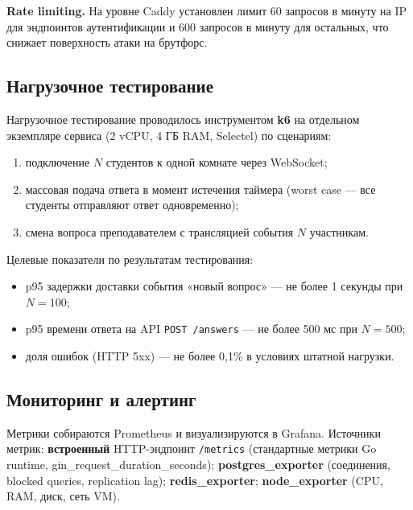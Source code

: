 \textbf{Rate limiting.} На уровне Caddy установлен лимит
60 запросов в минуту на IP для эндпоинтов аутентификации
и 600 запросов в минуту для остальных, что снижает поверхность
атаки на брутфорс.

\subsection{Нагрузочное тестирование}

Нагрузочное тестирование проводилось инструментом \textbf{k6}
на отдельном экземпляре сервиса (2 vCPU, 4 ГБ RAM, Selectel)
по сценариям:
\begin{enumerate}[label=\arabic*., noitemsep]
    \item подключение $N$ студентов к одной комнате
          через WebSocket;
    \item массовая подача ответа в момент истечения таймера
          (worst case --- все студенты отправляют ответ
          одновременно);
    \item смена вопроса преподавателем с трансляцией события
          $N$ участникам.
\end{enumerate}


Целевые показатели по результатам тестирования:
\begin{itemize}[noitemsep]
    \item p95 задержки доставки события «новый вопрос» ---
          не более 1 секунды при $N = 100$;
    \item p95 времени ответа на API \texttt{POST /answers} ---
          не более 500 мс при $N = 500$;
    \item доля ошибок (HTTP 5xx) --- не более 0{,}1\%
          в условиях штатной нагрузки.
\end{itemize}

\subsection{Мониторинг и алертинг}

Метрики собираются Prometheus и визуализируются в Grafana.
Источники метрик: \textbf{встроенный} HTTP-эндпоинт \texttt{/metrics}
(стандартные метрики Go runtime, gin\_request\_duration\_seconds);
\textbf{postgres\_exporter} (соединения, blocked queries,
replication lag); \textbf{redis\_exporter}; \textbf{node\_exporter}
(CPU, RAM, диск, сеть VM).

